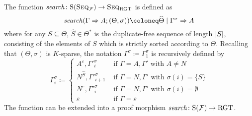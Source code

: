 \begin{lemma}
  The function $\mathit{search} \colon \mathrm{S}(\textsc{Seq}_{\mathcal{F}}) \to \textsc{Seq}_{\mathrm{RGT}}$ is defined as
  \[\search(\Gamma \sdash A; (\Theta, \sigma)) \coloneq \widehat{\Theta}
    \rsep \Gamma^\sigma \sdash A\]
  where for any $S \subseteq \Theta$, $\widehat{S} \in \Theta^*$ is the
  duplicate-free sequence of length
  $|S|$, consisting of the elements of $S$ which is strictly sorted
  according to $\Theta$. Recalling that $(\Theta, \sigma)$ is $K$-sparse, the notation
  $\Gamma^\sigma \coloneq \Gamma^\sigma_1$ is recursively defined by
  \[
    \Gamma^\sigma_i \coloneq
    \begin{cases}
      A^\varepsilon, \Gamma'^\sigma_i & \text{ if } \Gamma = A, \Gamma'
      \text{ with } A \neq N \\
      N^{\hat{S}}, \Gamma'^\sigma_{i + 1} & \text{ if } \Gamma = N, \Gamma'
      \text{ with } \sigma(i) = \{S\} \\
      N^\varepsilon, \Gamma'^\sigma_i & \text{ if } \Gamma = N, \Gamma'
      \text{ with } \sigma(i) = \emptyset \\
      \varepsilon & \text{ if } \Gamma = \varepsilon
    \end{cases}
  \]
  The function can be extended into a proof morphism $\mathit{search} \colon \mathrm{S}(\mathcal{F}) \to \mathrm{RGT}$.
\end{lemma}

